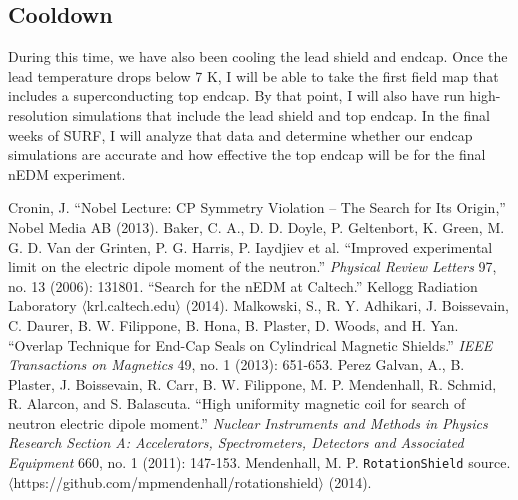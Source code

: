 \documentclass[twocolumn,aps,prb,citeautoscript]{revtex4-1}
\begin{document}
\subsection{Cooldown}

During this time, we have also been cooling the lead shield and endcap. Once the lead temperature drops below
7 K, I will be able to take the first field map that includes a superconducting top endcap. By that point, I will
also have run high-resolution simulations that include the lead shield and top endcap. In the final weeks of SURF,
I will analyze that data and determine whether our endcap simulations are accurate and how effective the top endcap
will be for the final nEDM experiment.


\begin{thebibliography}{}
 Cronin, J. ``Nobel Lecture: CP Symmetry Violation – The Search
for Its Origin,'' Nobel Media AB (2013).
 Baker, C. A., D. D. Doyle, P. Geltenbort, K. Green, M. G. D. Van der Grinten, P. G. Harris, P. Iaydjiev et al. ``Improved experimental limit on the electric dipole moment of the neutron.'' \textit{Physical Review Letters} 97, no. 13 (2006): 131801.
 ``Search for the nEDM at Caltech.'' Kellogg Radiation Laboratory
$\langle$krl.caltech.edu$\rangle$ (2014).
 Malkowski, S., R. Y. Adhikari, J. Boissevain, C. Daurer, B. W. Filippone, B. Hona, B. Plaster, D. Woods, and H. Yan. ``Overlap Technique for End-Cap Seals on Cylindrical Magnetic Shields.'' \textit{IEEE Transactions on Magnetics} 49, no. 1 (2013): 651-653.
 Perez Galvan, A., B. Plaster, J. Boissevain, R. Carr, B. W. Filippone, M. P. Mendenhall, R. Schmid, R. Alarcon, and S. Balascuta. ``High uniformity magnetic coil for search of neutron electric dipole moment.'' \textit{Nuclear Instruments and Methods in Physics Research Section A: Accelerators, Spectrometers, Detectors and Associated Equipment} 660, no. 1 (2011): 147-153.
 Mendenhall, M. P. \texttt{RotationShield} source. $\langle$https://github.com/mpmendenhall/rotationshield$\rangle$ (2014).
\end{thebibliography}
\end{document}

